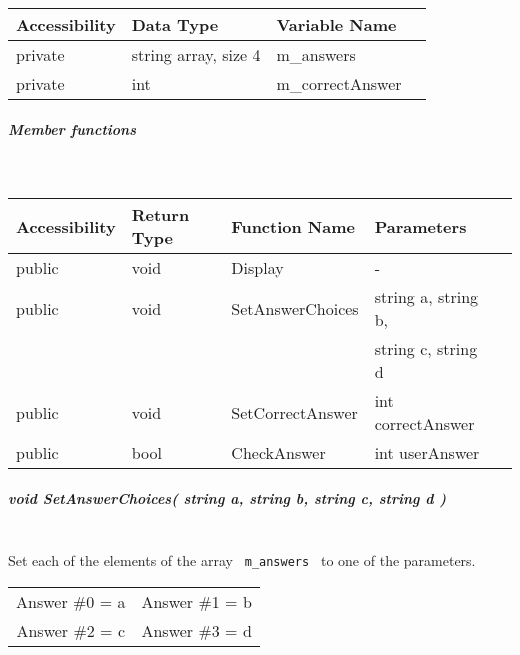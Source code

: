 \documentclass[a4paper,12pt]{book}
\begin{document}
                            \begin{tabular}{ l l l l }
                                Accessibility & Data Type & Variable Name \\ \hline{}
                                private & string array, size 4 & m\_answers \\ \hline{}
                                private & int & m\_correctAnswer
                            \end{tabular}
                        
                        \subparagraph{ Member functions } ~\\

                            \begin{tabular}{ l l l l l }
                                Accessibility & Return Type & Function Name & Parameters  \\ \hline{}
                                public & void & Display & -  \\ \hline{}
                                public & void & SetAnswerChoices & string a, string b, \\
                                & & & string c, string d \\ \hline{}
                                public & void & SetCorrectAnswer & int correctAnswer \\ \hline{}
                                public & bool & CheckAnswer & int userAnswer
                            \end{tabular}


                        
                        \subparagraph{ void SetAnswerChoices( string a, string b, string c, string d ) } ~\\
                            Set each of the elements of the array \texttt{ m\_answers }
                            to one of the parameters. \\

                            \begin{tabular}{ c c }
                                Answer \#0 = a &
                                Answer \#1 = b \\
                                Answer \#2 = c &
                                Answer \#3 = d
                            \end{tabular}
                            
\end{document}
